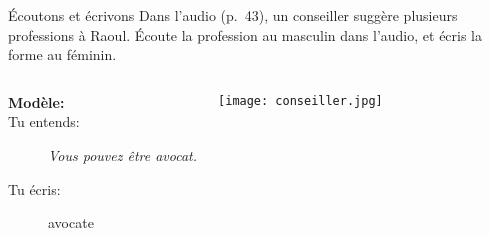 \begin{frame}{Écoutons et écrivons}
  Dans l'audio (p.~43), un conseiller suggère plusieurs professions à Raoul.
  Écoute la profession au masculin dans l'audio, et écris la forme au féminin.
  \begin{columns}
      \begin{description}
        \item[\textbf{Modèle:}]
        \item[Tu entends:] \emph{Vous pouvez être avocat.}
        \item[Tu écris:] avocat\alert{e}
      \end{description}
      \begin{center}
        \texttt{[image: conseiller.jpg]}
      \end{center}
  \end{columns}
\end{frame}